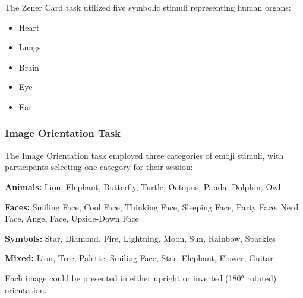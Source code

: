 \documentclass[12pt]{article} %
\begin{document}
The Zener Card task utilized five symbolic stimuli representing human organs:
\begin{itemize}
    \item Heart
    \item Lungs
    \item Brain
    \item Eye
    \item Ear
\end{itemize}

\subsubsection*{Image Orientation Task}

The Image Orientation task employed three categories of emoji stimuli, with participants selecting one category for their session:

\noindent
\textbf{Animals:} Lion, Elephant, Butterfly, Turtle, Octopus, Panda, Dolphin, Owl

\noindent
\textbf{Faces:} Smiling Face, Cool Face, Thinking Face, Sleeping Face, Party Face, Nerd Face, Angel Face, Upside-Down Face

\noindent
\textbf{Symbols:} Star, Diamond, Fire, Lightning, Moon, Sun, Rainbow, Sparkles

\noindent
\textbf{Mixed:} Lion, Tree, Palette, Smiling Face, Star, Elephant, Flower, Guitar

\vspace{0.5em}
\noindent
Each image could be presented in either upright or inverted (180° rotated) orientation.
\end{document}
